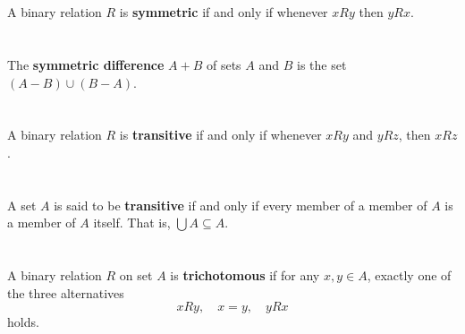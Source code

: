 \documentclass{report}
\begin{document}

\section{}%

  A binary relation $R$ is \textbf{symmetric} if and only if whenever $xRy$ then
    $yRx$.


\section{}%

  The \textbf{symmetric difference} $A + B$ of sets $A$ and $B$ is the set
    $(A - B) \cup (B - A)$.


\section{}%

  A binary relation $R$ is \textbf{transitive} if and only if whenever $xRy$ and
    $yRz$, then $xRz$.



\section{}%

  A set $A$ is said to be \textbf{transitive} if and only if every member of a
    member of $A$ is a member of $A$ itself.
  That is, $\bigcup A \subseteq A$.

\section{}%

  A binary relation $R$ on set $A$ is \textbf{trichotomous} if for any
    $x, y \in A$, exactly one of the three alternatives
    $$xRy, \quad x = y, \quad yRx$$
    holds.
\end{document}
